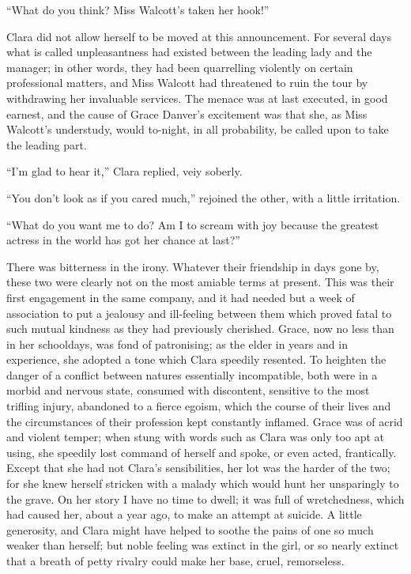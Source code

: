 ``What do you think? Miss Walcott's taken her hook!''

Clara did not allow herself to be moved at this announcement. For
several days what is called unpleasantness had existed between the
leading lady and the manager; in other words, they had been quarrelling
violently on certain professional matters, and Miss Walcott had
threatened to ruin the tour by withdrawing her invaluable services. The
menace was at last executed, in good earnest, and the cause of Grace
Danver's excitement was that she, as Miss Walcott's understudy, would
to-night, in all probability, be called upon to take the leading part.

{\protect\hypertarget{200}{}{}}``I'm glad to hear it,'' Clara replied,
veiy soberly.

``You don't look as if you cared much,'' rejoined the other, with a
little irritation.

``What do you want me to do? Am I to scream with joy because the
greatest actress in the world has got her chance at last?''

There was bitterness in the irony. Whatever their friendship in days
gone by, these two were clearly not on the most amiable terms at
present. This was their first engagement in the same company, and it had
needed but a week of association to put a jealousy and ill-feeling
between them which proved fatal to such mutual kindness as they had
previously cherished. Grace, now no less than in her schooldays, was
fond of patronising; as the elder in years and in experience, she
adopted a tone which Clara speedily resented. To heighten the danger of
a conflict between natures essentially incompatible, both were in a
morbid and nervous state, consumed with discontent, sensitive to the
most trifling injury, abandoned to a fierce egoism, which
{\protect\hypertarget{201}{}{}}the course of their lives and the
circumstances of their profession kept constantly inflamed. Grace was of
acrid and violent temper; when stung with words such as Clara was only
too apt at using, she speedily lost command of herself and spoke, or
even acted, frantically. Except that she had not Clara's sensibilities,
her lot was the harder of the two; for she knew herself stricken with a
malady which would hunt her unsparingly to the grave. On her story I
have no time to dwell; it was full of wretchedness, which had caused
her, about a year ago, to make an attempt at suicide. A little
generosity, and Clara might have helped to soothe the pains of one so
much weaker than herself; but noble feeling was extinct in the girl, or
so nearly extinct that a breath of petty rivalry could make her base,
cruel, remorseless.

